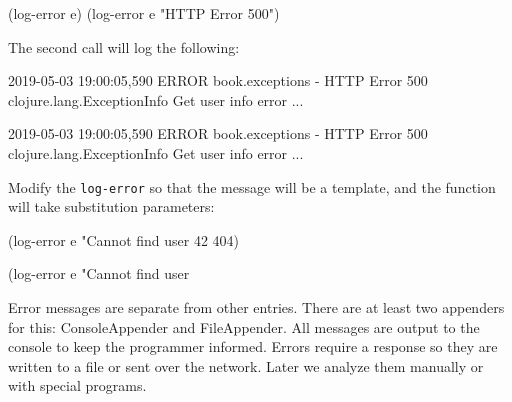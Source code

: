 \begin{english}
  \begin{clojure}
(log-error e)
(log-error e "HTTP Error 500")
  \end{clojure}
\end{english}

The second call will log the following:

\ifx\DEVICETYPE\MOBILE

\begin{english}
  \begin{text}
2019-05-03 19:00:05,590 ERROR
book.exceptions - HTTP Error 500
clojure.lang.ExceptionInfo
  Get user info error
  ...
  \end{text}
\end{english}

\else

\begin{english}
  \begin{text}
2019-05-03 19:00:05,590 ERROR book.exceptions - HTTP Error 500
clojure.lang.ExceptionInfo
  Get user info error
  ...
  \end{text}
\end{english}

\fi

Modify the \verb|log-error| so that the message will be a template, and the function will take substitution parameters:

\ifx\DEVICETYPE\MOBILE

\begin{english}
  \begin{clojure}
(log-error e
  "Cannot find user %
  42 404)
  \end{clojure}
\end{english}

\else

\begin{english}
  \begin{clojure}
(log-error e "Cannot find user %
  \end{clojure}
\end{english}

\fi

Error messages are separate from other entries. There are at least two appenders for this: ConsoleAppender and FileAppender. All messages are output to the console to keep the programmer informed. Errors require a response so they are written to a file or sent over the network. Later we analyze them manually or with special programs.

